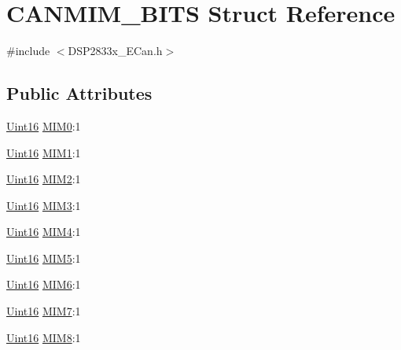 \hypertarget{struct_c_a_n_m_i_m___b_i_t_s}{}\section{C\+A\+N\+M\+I\+M\+\_\+\+B\+I\+T\+S Struct Reference}
\label{struct_c_a_n_m_i_m___b_i_t_s}


{\ttfamily \#include $<$D\+S\+P2833x\+\_\+\+E\+Can.\+h$>$}

\subsection*{Public Attributes}
\begin{DoxyCompactItemize}
\item 
\hyperlink{_d_s_p2833x___device_8h_a59a9f6be4562c327cbfb4f7e8e18f08b}{Uint16} \hyperlink{struct_c_a_n_m_i_m___b_i_t_s_a864347be6c59d27517696aba6976421e}{M\+I\+M0}\+:1
\item 
\hyperlink{_d_s_p2833x___device_8h_a59a9f6be4562c327cbfb4f7e8e18f08b}{Uint16} \hyperlink{struct_c_a_n_m_i_m___b_i_t_s_ae4f0d15d5f01f66d7f636105890e976c}{M\+I\+M1}\+:1
\item 
\hyperlink{_d_s_p2833x___device_8h_a59a9f6be4562c327cbfb4f7e8e18f08b}{Uint16} \hyperlink{struct_c_a_n_m_i_m___b_i_t_s_a7256ca2f8f6d3ea40c4c18e4966c9d4c}{M\+I\+M2}\+:1
\item 
\hyperlink{_d_s_p2833x___device_8h_a59a9f6be4562c327cbfb4f7e8e18f08b}{Uint16} \hyperlink{struct_c_a_n_m_i_m___b_i_t_s_a72abe8223547498ee66e6dd069bb51d9}{M\+I\+M3}\+:1
\item 
\hyperlink{_d_s_p2833x___device_8h_a59a9f6be4562c327cbfb4f7e8e18f08b}{Uint16} \hyperlink{struct_c_a_n_m_i_m___b_i_t_s_a0a251828927d84989c494f0502bddaa9}{M\+I\+M4}\+:1
\item 
\hyperlink{_d_s_p2833x___device_8h_a59a9f6be4562c327cbfb4f7e8e18f08b}{Uint16} \hyperlink{struct_c_a_n_m_i_m___b_i_t_s_a96990353959d9a3a017e41e1e1f85e4f}{M\+I\+M5}\+:1
\item 
\hyperlink{_d_s_p2833x___device_8h_a59a9f6be4562c327cbfb4f7e8e18f08b}{Uint16} \hyperlink{struct_c_a_n_m_i_m___b_i_t_s_a90d35060bbf520514e1809a4e877ad54}{M\+I\+M6}\+:1
\item 
\hyperlink{_d_s_p2833x___device_8h_a59a9f6be4562c327cbfb4f7e8e18f08b}{Uint16} \hyperlink{struct_c_a_n_m_i_m___b_i_t_s_a345ac2db074d51ee2aa7f768c6d7b3c8}{M\+I\+M7}\+:1
\item 
\hyperlink{_d_s_p2833x___device_8h_a59a9f6be4562c327cbfb4f7e8e18f08b}{Uint16} \hyperlink{struct_c_a_n_m_i_m___b_i_t_s_aba0b06aa0a46f1f351995334bb8d4b7f}{M\+I\+M8}\+:1

\end{DoxyCompactItemize}
